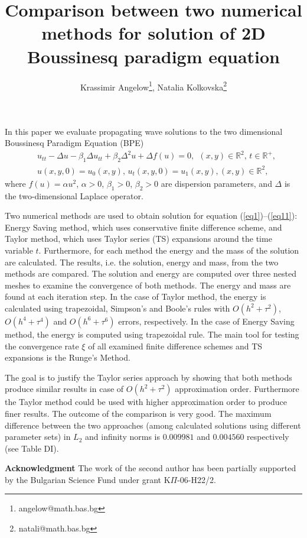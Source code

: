 \documentclass{article}
\newcommand{\RR}{\mathbb{R}}
\newcommand{\rf}[1]{(\ref{#1})}
\begin{document}
\title{Comparison between two numerical methods for solution of 2D Boussinesq paradigm equation}

\author{Krassimir Angelow\thanks{angelow@math.bas.bg}, Natalia Kolkovska\thanks{natali@math.bas.bg}}

\maketitle





In this paper we evaluate propagating wave solutions to the two dimensional Boussinesq Paradigm Equation (BPE)
\begin{align} 
&u_{tt} - \Delta u -\beta_1  \Delta u_{tt} +\beta_2 \Delta ^2 u + \Delta f(u)=0,~~     (x,y) \in \RR^2, \, t\in\RR^+, \label{eq1}
\\ &u(x,y,0)=u_0(x,y), \, u_t(x,y,0)=u_1(x,y),   (x,y) \in \RR^2,~~\label{eq11}
\end{align}
where $f(u)=\alpha u^2$,  $\alpha>0$, $\beta_1>0$, $\beta_2>0$  are dispersion parameters, and $\Delta$ is the two-dimensional Laplace operator. 

Two numerical methods are used to obtain solution for equation \rf{eq1}--\rf{eq11}: Energy Saving method, which uses conservative finite difference scheme, and Taylor method, which uses Taylor series (TS) expansions around the time variable $t$. Furthermore, for each method the energy and the mass of the solution are calculated. The results, i.e. the solution, energy and mass, from the two methods are compared.
 The solution and energy are computed over three nested meshes to examine the convergence of both methods. The energy and mass are  found at each iteration step. In the case of Taylor method, the energy is calculated using trapezoidal, Simpson's and Boole's rules with $O(h^{2} + \tau^2 )$, $O(h^{4} + \tau^4 )$ and $O(h^{6} + \tau^6 )$ errors, respectively. In the case of Energy Saving method, the energy is computed using trapezoidal rule. The main tool for testing the convergence rate $\xi$ of all examined finite difference schemes and TS expansions is the Runge's Method. 

The goal is to justify the Taylor series approach by showing that both methods produce similar results in case of $O(h^{2} + \tau^2 )$ approximation order. Furthermore the Taylor method could be used with higher approximation order to produce finer results. The outcome of the comparison is very good. The maximum difference between the two approaches (among calculated solutions using different parameter sets) in $L_2$ and infinity norms is $0.009981$ and $0.004560$ respectively (see Table DI).

{\bf{Acknowledgment}}
The work of the second author has been partially supported by
the Bulgarian Science Fund under grant K$\Pi$-06-H22/2.
\end{document}
